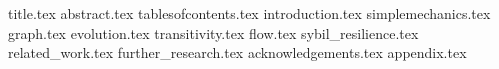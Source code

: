 \documentclass[11pt]{llncs}
\begin{document}
  {title.tex}
  \thispagestyle{plain}
  {abstract.tex}
  \clearpage
  {tablesofcontents.tex}
  {introduction.tex}
  {simplemechanics.tex}
  {graph.tex}
  {evolution.tex}
  {transitivity.tex}
  {flow.tex}
  {sybil_resilience.tex}
  {related_work.tex}
  {further_research.tex}
  {acknowledgements.tex}
  {appendix.tex}
  
\end{document}
